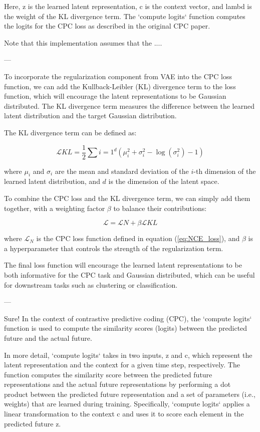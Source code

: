 Here, z is the learned latent representation, c is the context vector, and lambd is the weight of the KL divergence term. The `compute logits` function computes the logits for the CPC loss as described in the original CPC paper.

Note that this implementation assumes that the ....

---


To incorporate the regularization component from VAE into the CPC loss function, we can add the Kullback-Leibler (KL) divergence term to the loss function, which will encourage the latent representations to be Gaussian distributed. The KL divergence term measures the difference between the learned latent distribution and the target Gaussian distribution.

The KL divergence term can be defined as:

$$\mathcal{L}{KL} = \frac{1}{2}\sum{i=1}^d (\mu_i^2 + \sigma_i^2 - \log(\sigma_i^2) - 1)$$

where $\mu_i$ and $\sigma_i$ are the mean and standard deviation of the $i$-th dimension of the learned latent distribution, and $d$ is the dimension of the latent space.

To combine the CPC loss and the KL divergence term, we can simply add them together, with a weighting factor $\beta$ to balance their contributions:

$$\mathcal{L} = \mathcal{L}N + \beta\mathcal{L}{KL}$$

where $\mathcal{L}_N$ is the CPC loss function defined in equation (\ref{eq:NCE_loss}), and $\beta$ is a hyperparameter that controls the strength of the regularization term.

The final loss function will encourage the learned latent representations to be both informative for the CPC task and Gaussian distributed, which can be useful for downstream tasks such as clustering or classification.



---

Sure! In the context of contrastive predictive coding (CPC), the `compute logits` function is used to compute the similarity scores (logits) between the predicted future and the actual future.

In more detail, `compute logits` takes in two inputs, z and c, which represent the latent representation and the context for a given time step, respectively. The function computes the similarity score between the predicted future representations and the actual future representations by performing a dot product between the predicted future representation and a set of parameters (i.e., weights) that are learned during training. Specifically, `compute logits` applies a linear transformation to the context c and uses it to score each element in the predicted future z.

